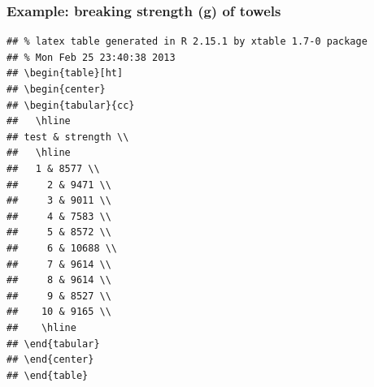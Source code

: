 \documentclass[handout]{beamer}\usepackage{graphicx, color}
\makeatletter
\newenvironment{kframe}{%
 \def\at@end@of@kframe{}%
 \ifinner\ifhmode%
  \def\at@end@of@kframe{\end{minipage}}%
  \begin{minipage}{\columnwidth}%
 \fi\fi%
 \def\FrameCommand##1{\hskip\@totalleftmargin \hskip-\fboxsep
 \colorbox{shadecolor}{##1}\hskip-\fboxsep
     \hskip-\linewidth \hskip-\@totalleftmargin \hskip\columnwidth}%
 \MakeFramed {\advance\hsize-\width
   \@totalleftmargin\z@ \linewidth\hsize
   \@setminipage}}%
 {\par\unskip\endMakeFramed%
 \at@end@of@kframe}
\newenvironment{knitrout}{}{} %
\numberwithin{equation}{section}
\makeatother
\begin{document}
\begin{frame}[fragile]
\frametitle{Example: breaking strength (g) of towels}

\begin{knitrout}
\color{fgcolor}\begin{kframe}
\begin{verbatim}
## % latex table generated in R 2.15.1 by xtable 1.7-0 package
## % Mon Feb 25 23:40:38 2013
## \begin{table}[ht]
## \begin{center}
## \begin{tabular}{cc}
##   \hline
## test & strength \\ 
##   \hline
##   1 & 8577 \\ 
##     2 & 9471 \\ 
##     3 & 9011 \\ 
##     4 & 7583 \\ 
##     5 & 8572 \\ 
##     6 & 10688 \\ 
##     7 & 9614 \\ 
##     8 & 9614 \\ 
##     9 & 8527 \\ 
##    10 & 9165 \\ 
##    \hline
## \end{tabular}
## \end{center}
## \end{table}
\end{verbatim}
\end{kframe}
\end{knitrout}


\end{frame}
\end{document}
